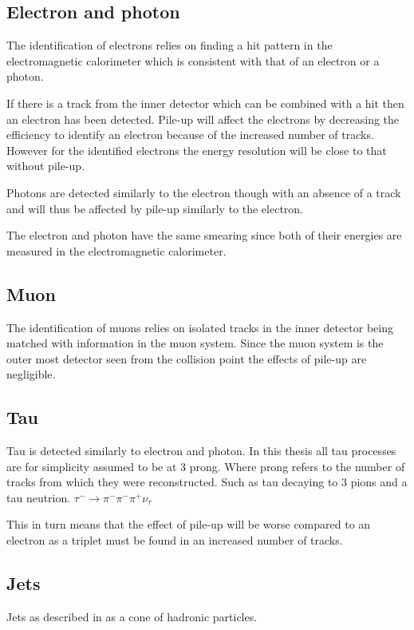 \subsection{Electron and photon}
The identification of electrons relies on finding a hit pattern in the electromagnetic calorimeter which is consistent with that of an electron or a photon. 

If there is a track from the inner detector which can be combined with a hit then an electron has been detected. Pile-up will affect the electrons by decreasing the efficiency to identify an electron because of the increased number of tracks. However for the identified electrons the energy resolution will be close to that without pile-up. 

Photons are detected similarly to the electron though with an absence of a track and will thus be affected by pile-up similarly to the electron.

The electron and photon have the same smearing since both of their energies are measured in the electromagnetic calorimeter. 

\subsection{Muon}
The identification of muons relies on isolated tracks in the inner detector  being matched with information in the muon system. Since the muon system is the outer most detector seen from the collision point the effects of pile-up are negligible.  
\subsection{Tau}\label{sec:smear:subsec:tau}
Tau is detected similarly to electron and photon.
In this thesis all tau processes are for simplicity assumed to be at 3 prong. Where prong refers to the number of tracks from which they were reconstructed. Such as tau decaying to 3 pions and a tau neutrion. $\tau ^{-} \rightarrow \pi ^{-} \pi ^{-} \pi ^{+} \nu _{\tau}$

This in turn means that the effect of pile-up will be worse compared to an electron as a triplet must be found in an increased number of tracks.
\subsection{Jets}\label{sec:smear:subsec:jets}
Jets as described in  as a cone of hadronic particles. 

